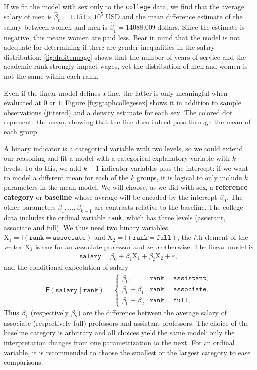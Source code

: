\documentclass[
  11pt,
  letterpaper,
]{book}
\theoremstyle{definition}
\theoremstyle{definition}
\theoremstyle{definition}
\theoremstyle{definition}
\theoremstyle{remark}
\begin{document}
If we fit the model with sex only to the \texttt{college} data, we find that the average salary of men is \(\widehat{\beta}_0=\ensuremath{1.151\times 10^{5}}\) USD and the mean difference estimate of the salary between women and men is \(\widehat{\beta}_1=14088.009\) dollars. Since the estimate is negative, this means women are paid less. Bear in mind that the model is not adequate for determining if there are gender inequalities in the salary distribution: \ref{fig:droitenuage} shows that the number of years of service and the academic rank strongly impact wages, yet the distribution of men and women is not the same within each rank.

Even if the linear model defines a line, the latter is only meaningful when evaluated at \(0\) or \(1\); Figure \ref{fig:graphcollegesex} shows it in addition to sample observations (jittered) and a density estimate for each sex. The colored dot represents the mean, showing that the line does indeed pass through the mean of each group.

A binary indicator is a categorical variable with two levels, so we could extend our reasoning and fit a model with a categorical explanatory variable with \(k\) levels. To do this, we add \(k-1\) indicator variables plus the intercept: if we want to model a different mean for each of the \(k\) groups, it is logical to only include \(k\) parameters in the mean model. We will choose, as we did with sex, a \textbf{reference category} or \textbf{baseline} whose average will be encoded by the intercept \(\beta_0\). The other parameters \(\beta_1, \ldots, \beta_{k-1}\) are contrasts relative to the baseline. The college data includes the ordinal variable \texttt{rank}, which has three levels (assistant, associate and full). We thus need two binary variables, \(\mathrm{X}_1 = \mathsf{I}(\texttt{rank}=\texttt{associate})\) and \(\mathrm{X}_2 = \mathsf{I}(\texttt{rank}=\texttt{full})\); the \(i\)th element of the vector \(\mathrm{X}_1\) is one for an associate professor and zero otherwise. The linear model is
\begin{align*}
\texttt{salary} =\beta_0 + \beta_1 \mathrm{X}_1+\beta_2\mathrm{X}_2 + \varepsilon,
\end{align*}
and the conditional expectation of salary
\begin{align*}
\mathsf{E}(\texttt{salary} \mid \texttt{rank})= \begin{cases}
\beta_0, & \texttt{rank}=\texttt{assistant},\\
\beta_0 + \beta_1 & \texttt{rank}=\texttt{associate},\\
\beta_0 + \beta_2 & \texttt{rank}=\texttt{full},
\end{cases}
\end{align*}
Thus \(\beta_1\) (respectively \(\beta_2\)) are the difference between the average salary of associate (respectively full) professors and assistant professors. The choice of the baseline category is arbitrary and all choices yield the same model: only the interpretation changes from one parametrization to the next. For an ordinal variable, it is recommended to choose the smallest or the largest category to ease comparisons.
\end{document}

